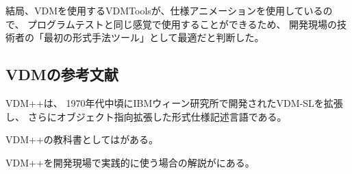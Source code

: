 結局、VDMを使用するVDMToolsが、仕様アニメーションを使用しているので、
プログラムテストと同じ感覚で使用することができるため、
開発現場の技術者の「最初の形式手法ツール」として最適だと判断した。

\subsection{VDMの参考文献}
	\label{VDMref}
VDM++\cite{Kyushu2016PP}は、
1970年代中頃にIBMウィーン研究所で開発されたVDM-SL\cite{Kyushu2016SL}を拡張し、
さらにオブジェクト指向拡張した形式仕様記述言語である。

VDM++の教科書としては\cite{Sakoh2010}がある。

VDM++を開発現場で実践的に使う場合の解説が\cite{Sahara2008}にある。


